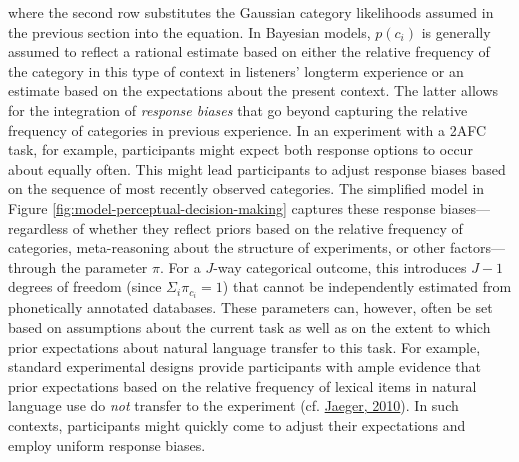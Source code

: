 \documentclass[
  11pt,
  english,
  man,floatsintext]{apa6}
\begin{document}
where the second row substitutes the Gaussian category likelihoods assumed in the previous section into the equation. In Bayesian models, \(p(c_i)\) is generally assumed to reflect a rational estimate based on either the relative frequency of the category in this type of context in listeners' longterm experience or an estimate based on the expectations about the present context. The latter allows for the integration of \emph{response biases} that go beyond capturing the relative frequency of categories in previous experience. In an experiment with a 2AFC task, for example, participants might expect both response options to occur about equally often. This might lead participants to adjust response biases based on the sequence of most recently observed categories. The simplified model in Figure \ref{fig:model-perceptual-decision-making} captures these response biases---regardless of whether they reflect priors based on the relative frequency of categories, meta-reasoning about the structure of experiments, or other factors---through the parameter \(\pi\).
For a \(J\)-way categorical outcome, this introduces \(J-1\) degrees of freedom (since \(\Sigma_i \pi_{c_i} = 1\)) that cannot be independently estimated from phonetically annotated databases. These parameters can, however, often be set based on assumptions about the current task as well as on the extent to which prior expectations about natural language transfer to this task. For example, standard experimental designs provide participants with ample evidence that prior expectations based on the relative frequency of lexical items in natural language use do \emph{not} transfer to the experiment (cf. \protect\hyperlink{ref-jaeger2010}{Jaeger, 2010}). In such contexts, participants might quickly come to adjust their expectations and employ uniform response biases.
\end{document}
